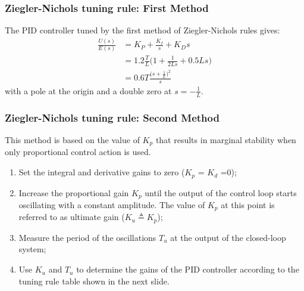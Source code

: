 \begin{frame}
	\frametitle{Ziegler-Nichols tuning rule: First Method}
	The PID controller tuned by the first method of Ziegler-Nichols rules gives:
	\vspace{-1.5em}
	\begin{align*}
		\frac{U(s)}{E(s)} &= K_P + \frac{K_I}{s} + K_D s\\
		&= 1.2\frac{T}{L} \big (1 + \frac{1}{2Ls} + 0.5Ls \big)\\
		&= 0.6 T \frac{\big (s + \frac{1}{L} \big)^2}{s}
	\end{align*}
	with a pole at the origin and a double zero at $s = -\frac{1}{L}$.
\end{frame}

\begin{frame}
	\frametitle{Ziegler-Nichols tuning rule: Second Method}
	This method is based on the value of $K_p$ that results in marginal stability when only proportional control action is used.
	\begin{enumerate}
		\item Set the integral and derivative gains to zero ($K_p$ = $K_d$ =0);
		\item Increase the proportional gain $K_p$ until the output of the control loop starts oscillating with a constant amplitude. The value of $K_p$ at this point is referred to as ultimate gain ($K_u \triangleq K_p$);
		\item Measure the period of the oscillations $T_u$ at the output of the closed-loop system;
		\item Use $K_u$ and $T_u$ to determine the gains of the PID controller according to the tuning rule table shown in the next slide.
	\end{enumerate}
\end{frame}


